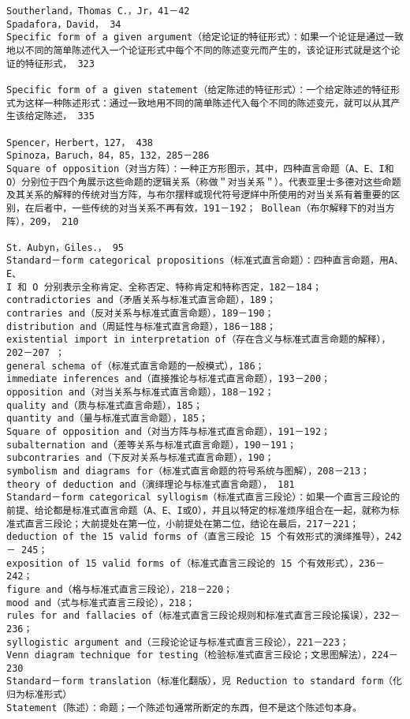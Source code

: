 \begin{verbatim}
Southerland，Thomas C．，Jr，41－42
Spadafora，David， 34
Specific form of a given argument（给定论证的特征形式）：如果一个论证是通过一致地以不同的简单陈述代入一个论证形式中每个不同的陈述变元而产生的，该论证形式就是这个论证的特征形式， 323

Specific form of a given statement（给定陈述的特征形式）：一个给定陈述的特征形式为这样一种陈述形式：通过一致地用不同的简单陈述代入每个不同的陈述变元，就可以从其产生该给定陈述， 335

Spencer，Herbert，127， 438
Spinoza，Baruch，84，85，132，285－286
Square of opposition（对当方阵）：一种正方形图示，其中，四种直言命题（A、E、I和 O）分别位于四个角展示这些命题的逻辑关系（称做＂对当关系＂）。代表亚里士多德对这些命题及其关系的解释的传统对当方阵，与布尔摆䉽或现代符号逻絴中所使用的对当关系有着重要的区别，在后者中，一些传统的对当关系不再有效，191－192； Bollean（布尔解释下的对当方阵），209， 210

St．Aubyn，Giles．， 95
Standard－form categorical propositions（标准式直言命题）：四种直言命题，用A、E、
I 和 O 分别表示全称肯定、全称否定、特称肯定和特称否定，182－184；
contradictories and（矛盾关系与标准式直言命题），189；
contraries and（反对关系与标准式直言命题），189－190；
distribution and（周延性与标准式直言命题），186－188；
existential import in interpretation of（存在含义与标准式直言命题的解释）， 202－207 ；
general schema of（标准式直言命题的一般模式），186；
immediate inferences and（直接推论与标准式直言命题），193－200；
opposition and（对当关系与标准式直言命题），188－192；
quality and（质与标准式直言命题），185；
quantity and（量与标准式直言命题），185；
Square of opposition and（对当方阵与标准式直言命题），191－192；
subalternation and（差等关系与标准式直言命题），190－191；
subcontraries and（下反对关系与标准式直言命题），190；
symbolism and diagrams for（标准式直言命题的符号系统与图解），208－213；
theory of deduction and（演绎理论与标准式直言命题）， 181
Standard－form categorical syllogism（标准式直言三段论）：如果一个直言三段论的前提、给论都是标准式直言命题（A、E、I或O），并且以特定的标准烦序组合在一起，就称为标准式直言三段论；大前提处在第一位，小前提处在第二位，结论在最后，217－221；
deduction of the 15 valid forms of（直言三段论 15 个有效形式的演绎推导），242－ 245；
exposition of 15 valid forms of（标准式直言三段论的 15 个有效形式），236－242；
figure and（格与标准式直言三段论），218－220；
mood and（式与标准式直言三段论），218；
rules for and fallacies of（标准式直言三段论规则和标准式直言三段论㨙误），232－ 236；
syllogistic argument and（三段论论证与标准式直言三段论），221－223；
Venn diagram technique for testing（检验标准式直言三段论；文思图解法），224－ 230
Standard－form translation（标准化翻版），児 Reduction to standard form（化归为标准形式）
Statement（陈述）：命题；一个陈述句通常所断定的东西，但不是这个陈述句本身。


\end{verbatim}
